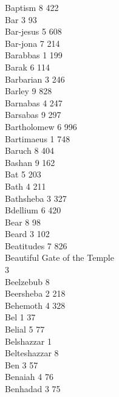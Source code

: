 Baptism \hfill 8 \quad \phantom{0}422\\
Bar \hfill 3 \quad \phantom{0}\phantom{0}93\\
Bar-jesus \hfill 5 \quad \phantom{0}608\\
Bar-jona \hfill 7 \quad \phantom{0}214\\
Barabbas \hfill 1 \quad \phantom{0}199\\
Barak \hfill 6 \quad \phantom{0}114\\
Barbarian \hfill 3 \quad \phantom{0}246\\
Barley \hfill 9 \quad \phantom{0}828\\
Barnabas \hfill 4 \quad \phantom{0}247\\
Barsabas \hfill 9 \quad \phantom{0}297\\
Bartholomew \hfill 6 \quad \phantom{0}996\\
Bartimaeus \hfill 1 \quad \phantom{0}748\\
Baruch \hfill 8 \quad \phantom{0}404\\
Bashan \hfill 9 \quad \phantom{0}162\\
Bat \hfill 5 \quad \phantom{0}203\\
Bath \hfill 4 \quad \phantom{0}211\\
Bathsheba \hfill 3 \quad \phantom{0}327\\
Bdellium \hfill 6 \quad \phantom{0}420\\
Bear \hfill 8 \quad \phantom{0}\phantom{0}98\\
Beard \hfill 3 \quad \phantom{0}102\\
Beatitudes \hfill 7 \quad \phantom{0}826\\
Beautiful Gate of the Temple \\ \mbox{} \hfill 3 \\
Beelzebub \hfill 8 \\
Beersheba \hfill 2 \quad \phantom{0}218\\
Behemoth \hfill 4 \quad \phantom{0}328\\
Bel \hfill 1 \quad \phantom{0}\phantom{0}37\\
Belial \hfill 5 \quad \phantom{0}\phantom{0}77\\
Belshazzar \hfill 1 \\
Belteshazzar \hfill 8 \\
Ben \hfill 3 \quad \phantom{0}\phantom{0}57\\
Benaiah \hfill 4 \quad \phantom{0}\phantom{0}76\\
Benhadad \hfill 3 \quad \phantom{0}\phantom{0}75\\
